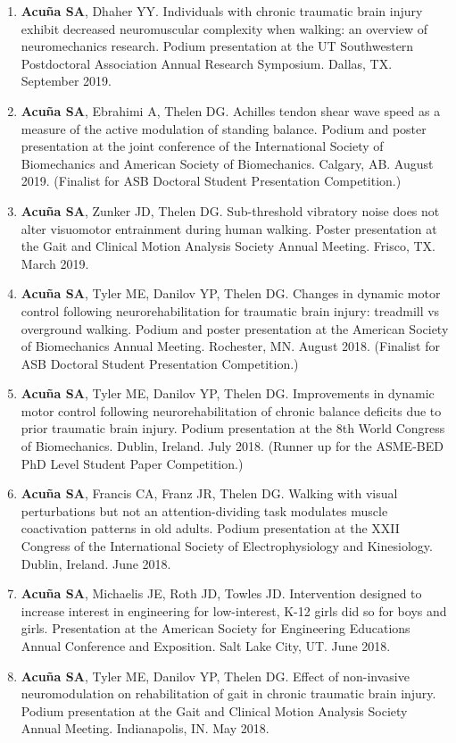 \documentclass[letterpaper, 10pt]{article}
\begin{document}
\begin{enumerate}
    \item \textbf{Acuña SA}, Dhaher YY. Individuals with chronic traumatic brain injury exhibit decreased neuromuscular complexity when walking: an overview of neuromechanics research. Podium presentation at the UT Southwestern Postdoctoral Association Annual Research Symposium. Dallas, TX. September 2019.
    \item \textbf{Acuña SA}, Ebrahimi A, Thelen DG. Achilles tendon shear wave speed as a measure of the active modulation of standing balance. Podium and poster presentation at the joint conference of the International Society of Biomechanics and American Society of Biomechanics. Calgary, AB. August 2019. (Finalist for ASB Doctoral Student Presentation Competition.)
    \item \textbf{Acuña SA}, Zunker JD, Thelen DG. Sub-threshold vibratory noise does not alter visuomotor entrainment during human walking. Poster presentation at the Gait and Clinical Motion Analysis Society Annual Meeting. Frisco, TX. March 2019.
    \item \textbf{Acuña SA}, Tyler ME, Danilov YP, Thelen DG. Changes in dynamic motor control following neurorehabilitation for traumatic brain injury: treadmill vs overground walking. Podium and poster presentation at the American Society of Biomechanics Annual Meeting. Rochester, MN. August 2018. (Finalist for ASB Doctoral Student Presentation Competition.)
    \item \textbf{Acuña SA}, Tyler ME, Danilov YP, Thelen DG. Improvements in dynamic motor control following neurorehabilitation of chronic balance deﬁcits due to prior traumatic brain injury. Podium presentation at the 8th World Congress of Biomechanics. Dublin, Ireland. July 2018. (Runner up for the ASME-BED PhD Level Student Paper Competition.)
    \item \textbf{Acuña SA}, Francis CA, Franz JR, Thelen DG. Walking with visual perturbations but not an attention-dividing task modulates muscle coactivation patterns in old adults. Podium presentation at the XXII Congress of the International Society of Electrophysiology and Kinesiology. Dublin, Ireland. June 2018.
    \item \textbf{Acuña SA}, Michaelis JE, Roth JD, Towles JD. Intervention designed to increase interest in engineering for low-interest, K-12 girls did so for boys and girls. Presentation at the American Society for Engineering Educations Annual Conference and Exposition. Salt Lake City, UT. June 2018.
    \item \textbf{Acuña SA}, Tyler ME, Danilov YP, Thelen DG. Effect of non-invasive neuromodulation on rehabilitation of gait in chronic traumatic brain injury. Podium presentation at the Gait and Clinical Motion Analysis Society Annual Meeting. Indianapolis, IN. May 2018.

\end{enumerate}
\end{document}
